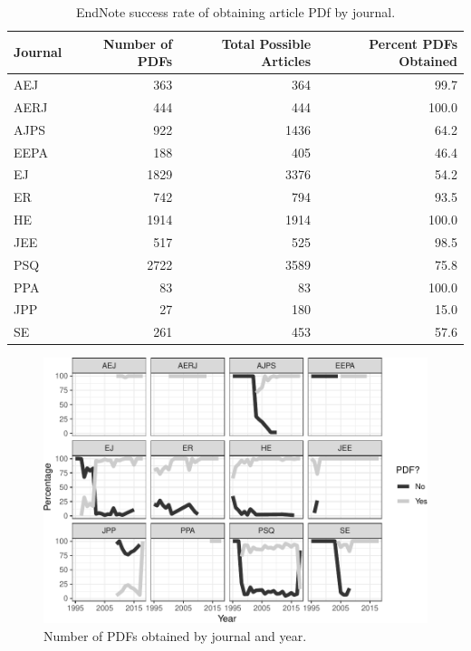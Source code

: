 \documentclass[english,,man]{apa6}
\begin{document}
\begin{table}[!h]

\caption{\label{tab:setup}EndNote success rate of obtaining article PDf by journal.}
\centering
\begin{tabular}{lrrr}
\toprule
Journal & Number of PDFs & Total Possible Articles & Percent PDFs Obtained\\
\midrule
AEJ & 363 & 364 & 99.7\\
AERJ & 444 & 444 & 100.0\\
AJPS & 922 & 1436 & 64.2\\
EEPA & 188 & 405 & 46.4\\
EJ & 1829 & 3376 & 54.2\\
\addlinespace
ER & 742 & 794 & 93.5\\
HE & 1914 & 1914 & 100.0\\
JEE & 517 & 525 & 98.5\\
PSQ & 2722 & 3589 & 75.8\\
PPA & 83 & 83 & 100.0\\
\addlinespace
JPP & 27 & 180 & 15.0\\
SE & 261 & 453 & 57.6\\
\bottomrule
\end{tabular}
\end{table}

\begin{figure}
\centering
\includegraphics{software_files/figure-latex/pdf-time-1.pdf}
\caption{\label{fig:pdf-time}Number of PDFs obtained by journal and year.}
\end{figure}
\end{document}
